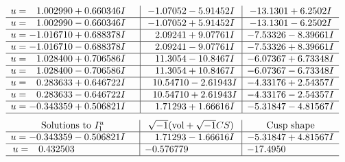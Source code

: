 \documentclass[1p]{elsarticle_modified}
\theoremstyle{definition}
\newcommand{\I}{\sqrt{-1}}
\begin{document}
$$\begin{array}{c|c|c}
\begin{aligned}
u &= \phantom{-}1.002990 + 0.660346 I\end{aligned}
 & -1.07052 - 5.91452 I & -13.1301 + 6.2502 I \\ \hline\begin{aligned}
u &= \phantom{-}1.002990 - 0.660346 I\end{aligned}
 & -1.07052 + 5.91452 I & -13.1301 - 6.2502 I \\ \hline\begin{aligned}
u &= -1.016710 + 0.688378 I\end{aligned}
 & \phantom{-}2.09241 + 9.07761 I & -7.53326 - 8.39661 I \\ \hline\begin{aligned}
u &= -1.016710 - 0.688378 I\end{aligned}
 & \phantom{-}2.09241 - 9.07761 I & -7.53326 + 8.39661 I \\ \hline\begin{aligned}
u &= \phantom{-}1.028400 + 0.706586 I\end{aligned}
 & \phantom{-}11.3054 - 10.8467 I & -6.07367 + 6.73348 I \\ \hline\begin{aligned}
u &= \phantom{-}1.028400 - 0.706586 I\end{aligned}
 & \phantom{-}11.3054 + 10.8467 I & -6.07367 - 6.73348 I \\ \hline\begin{aligned}
u &= \phantom{-}0.283633 + 0.646722 I\end{aligned}
 & \phantom{-}10.54710 - 2.61943 I & -4.33176 + 2.54357 I \\ \hline\begin{aligned}
u &= \phantom{-}0.283633 - 0.646722 I\end{aligned}
 & \phantom{-}10.54710 + 2.61943 I & -4.33176 - 2.54357 I \\ \hline\begin{aligned}
u &= -0.343359 + 0.506821 I\end{aligned}
 & \phantom{-}1.71293 + 1.66616 I & -5.31847 - 4.81567 I\\
 \hline 
 \end{array}$$\newpage$$\begin{array}{c|c|c}  
\text{Solutions to }I^u_{1}& \I (\text{vol} + \sqrt{-1}CS) & \text{Cusp shape}\\
 \hline 
\begin{aligned}
u &= -0.343359 - 0.506821 I\end{aligned}
 & \phantom{-}1.71293 - 1.66616 I & -5.31847 + 4.81567 I \\ \hline\begin{aligned}
u &= \phantom{-}0.432503\phantom{ +0.000000I}\end{aligned}
 & -0.576779\phantom{ +0.000000I} & -17.4950\phantom{ +0.000000I}\\
 \hline 
 \end{array}$$\newpage
\end{document}

